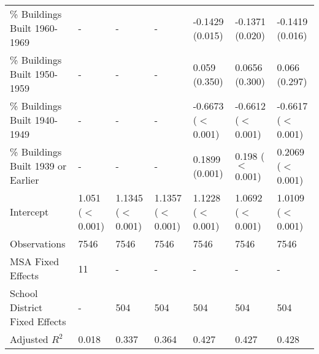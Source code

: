 \begin{table}[h]
\begin{tabular}{l|llllll}
\% Buildings Built 1960-1969 &- & - & - & -0.1429 (0.015) & -0.1371 (0.020) & -0.1419 (0.016) \\
\% Buildings Built 1950-1959 &- & - & - & 0.059 (0.350) & 0.0656 (0.300) & 0.066 (0.297) \\
\% Buildings Built 1940-1949 &- & - & - & -0.6673 ($<$0.001) & -0.6612 ($<$0.001) & -0.6617 ($<$0.001) \\
\% Buildings Built 1939 or Earlier &- & - & - & 0.1899 (0.001) & 0.198 ($<$0.001) & 0.2069 ($<$0.001) \\
Intercept &1.051 ($<$0.001) & 1.1345 ($<$0.001) & 1.1357 ($<$0.001) & 1.1228 ($<$0.001) & 1.0692 ($<$0.001) & 1.0109 ($<$0.001) \\
Observations &7546 & 7546 & 7546 & 7546 & 7546 & 7546 \\
MSA Fixed Effects &11 & - & - & - & - & - \\
School District Fixed Effects &- & 504 & 504 & 504 & 504 & 504 \\
Adjusted $R^2$ &0.018 & 0.337 & 0.364 & 0.427 & 0.427 & 0.428 \\\hline
\end{tabular}
\end{table}
